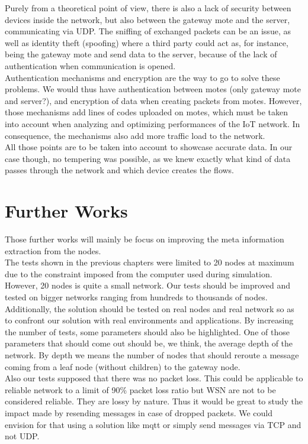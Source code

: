 Purely from a theoretical point of view, there is also a lack of security between devices inside the network, but also between the gateway mote and the server, communicating via UDP. The sniffing of exchanged packets can be an issue, as well as identity theft (spoofing) where a third party could act as, for instance, being the gateway mote and send data to the server, because of the lack of authentication when communication is opened. \\

Authentication mechanisms and encryption are the way to go to solve these problems. We would thus have authentication between motes (only gateway mote and server?), and encryption of data when creating packets from motes. However, those mechanisms add lines of codes uploaded on motes, which must be taken into account when analyzing and optimizing performances of the IoT network. In consequence, the mechanisms also add more traffic load to the network.\\

All those points are to be taken into account to showcase accurate data. In our case though, no tempering was possible, as we knew exactly what kind of data passes through the network and which device creates the flows.

\section{Further Works}

Those further works will mainly be focus on improving the meta information extraction from the nodes.\\

 The tests shown in the previous chapters were limited to 20 nodes at maximum due to the constraint imposed from the computer used during simulation. However, 20 nodes is quite a small network. Our tests should be improved and tested on bigger networks ranging from hundreds to thousands of nodes. Additionally, the solution should be tested on real nodes and real network so as to confront our solution with real environments and applications. By increasing the number of tests, some parameters should also be highlighted. One of those parameters that should come out should be, we think, the average depth of the network. By depth we means the number of nodes that should reroute a message coming from a leaf node (without children) to the gateway node.\\

 Also our tests supposed that there was no packet loss. This could be applicable to reliable network to a limit of 90\% packet loss ratio but WSN are not to be considered reliable. They are lossy by nature. Thus it would be great to study the impact made by resending messages in case of dropped packets. We could envision for that using a solution like \acrshort{mqtt} \cite{website:mqtt} or simply send messages via TCP and not UDP.\\

